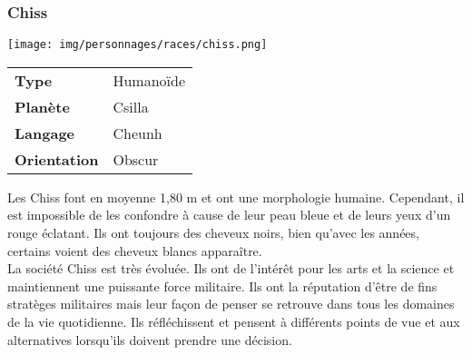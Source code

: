 \subsubsection{Chiss}
\begin{samepage}
	\texttt{[image: img/personnages/races/chiss.png]}

	\vspace{-9\baselineskip}

	\begin{flushright}
		\begin{tabular}{ l l }
			\textbf{Type} 			& Humanoïde \\
		   	\textbf{Planète} 		& Csilla \\
		   	\textbf{Langage} 		& Cheunh \\
		   	\textbf{Orientation} 	& Obscur \\
		\end{tabular}
	\end{flushright}
	\vspace{4\baselineskip}
\end{samepage}

Les Chiss font en moyenne 1,80 m et ont une morphologie humaine. Cependant, il est impossible de les confondre à cause de leur peau bleue et de leurs yeux d’un rouge éclatant. Ils ont toujours des cheveux noirs, bien qu’avec les années, certains voient des cheveux blancs apparaître. \\ 

La société Chiss est très évoluée. Ils ont de l’intérêt pour les arts et la science et maintiennent une puissante force militaire. Ils ont la réputation d’être de fins stratèges militaires mais leur façon de penser se retrouve dans tous les domaines de la vie quotidienne. Ils réfléchissent et pensent à différents points de vue et aux alternatives lorsqu’ils doivent prendre une décision.

